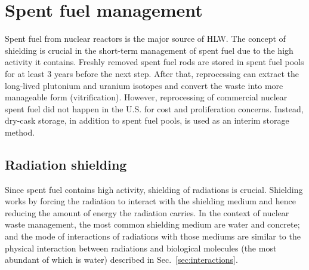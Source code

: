\documentclass[nofootinbib,preprint,aps]{revtex4-1}
\begin{document}
    \section{Spent fuel management}
    \label{sec:temp}
    Spent fuel from nuclear reactors is the major source of HLW.
    The concept of shielding is crucial in the short-term management of spent fuel due to the high activity
    it contains. Freshly removed spent fuel rods are stored in spent fuel pools for at least $3$ years before
    the next step. After that, reprocessing can extract the long-lived plutonium and uranium isotopes and
    convert the waste into more manageable form (vitrification). However, reprocessing of commercial
    nuclear spent fuel did not happen in the U.S. for cost and proliferation concerns. Instead, dry-cask
    storage, in addition to spent fuel pools, is used as an interim storage method.
    \subsection{Radiation shielding}
    Since spent fuel contains high activity, shielding of radiations is crucial. Shielding works by
    forcing the radiation to interact with the shielding medium and hence reducing the amount of energy
    the radiation carries. In the context of nuclear waste management, the most common shielding medium
    are water and concrete; and the mode of interactions of radiations with those mediums are similar to
    the physical interaction between radiations and biological molecules (the most abundant of which is
    water) described in Sec.~\ref{sec:interactions}.
\end{document}
